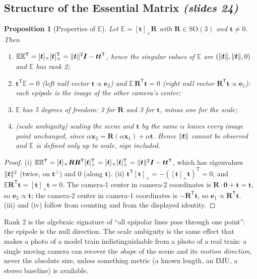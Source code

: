 \documentclass[11pt,a4paper]{article}
\newcommand{\slr}[1]{\texorpdfstring{\emph{(slides #1)}}{(slides #1)}}
\newcommand{\E}{\mathbb{E}}
\newcommand{\SO}{\mathrm{SO}(3)}
\newcommand{\sk}[1]{[#1]_{\times}}
\newcommand{\tr}{^{\mathsf T}}
\theoremstyle{definition}
\theoremstyle{plain}
\newtheorem{proposition}[definition]{Proposition}
\theoremstyle{remark}
\begin{document}
\subsection{Structure of the Essential Matrix \slr{24}}
\begin{proposition}[Properties of $\E$]\label{prop:eprops}
Let $\E=\sk{\bm t}\bm R$ with $\bm R\in\SO$ and $\bm t\neq0$. Then
\begin{enumerate}[nosep,label=(\roman*)]
\item $\E\E\tr=\sk{\bm t}\sk{\bm t}\tr=\norm{\bm t}^2\bm I-\bm t\bm t\tr$, hence the singular values of $\E$ are $(\lVert \bm t\rVert,\lVert \bm t\rVert,0)$ and $\E$ has rank 2;
\item $\bm t\tr\E=0$ (left null vector $\bm t\propto\bm e_2$) and $\E\,\bm R\tr\bm t=0$ (right null vector $\bm R\tr\bm t\propto\bm e_1$): each epipole is the image of the other camera's center;
\item $\E$ has 5 degrees of freedom: 3 for $\bm R$ and 3 for $\bm t$, minus one for the scale;
\item (scale ambiguity) scaling the scene and $\bm t$ by the same $\alpha$ leaves every image point unchanged, since $\alpha\bm x_2=\bm R(\alpha\bm x_1)+\alpha\bm t$. Hence $\lVert \bm t\rVert$ cannot be observed and $\E$ is defined only up to scale, sign included.
\end{enumerate}
\end{proposition}
\begin{proof}
(i) $\E\E\tr=\sk{\bm t}\bm R\bm R\tr\sk{\bm t}\tr=\sk{\bm t}\sk{\bm t}\tr=\norm{\bm t}^2\bm I-\bm t\bm t\tr$, which has eigenvalues $\lVert \bm t\rVert^2$ (twice, on $\bm t^\perp$) and $0$ (along $\bm t$).
(ii) $\bm t\tr\sk{\bm t}=-(\sk{\bm t}\bm t)\tr=0$, and $\E\bm R\tr\bm t=\sk{\bm t}\bm t=0$. The camera-1 center in camera-2 coordinates is $\bm R\cdot\bm 0+\bm t=\bm t$, so $\bm e_2\propto\bm t$; the camera-2 center in camera-1 coordinates is $-\bm R\tr\bm t$, so $\bm e_1\propto\bm R\tr\bm t$.
(iii) and (iv) follow from counting and from the displayed identity.
\end{proof}

\begin{intuition}
Rank 2 is the algebraic signature of ``all epipolar lines pass through one point'': the epipole is the null direction. The scale ambiguity is the same effect
that makes a photo of a model train indistinguishable from a photo of a real train: a single moving camera can recover the \emph{shape} of the scene and its \emph{motion direction}, never the absolute size, unless
something metric (a known length, an IMU, a stereo baseline) is available.
\end{intuition}
\end{document}
